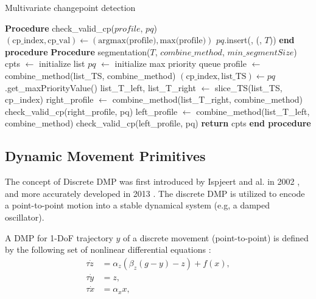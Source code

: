 \documentclass[conference]{IEEEtran}
\begin{document}
\begin{algorithm}
 \caption{Multivariate changepoint detection}
\begin{algorithmic}[1]
    \STATE \textbf{Procedure} check\_valid\_cp($profile$, $pq$)
    \STATE $(\text{cp\_index}, \text{cp\_val}) \leftarrow (\text{argmax(profile)}, \text{max(profile)})$
        \STATE $pq$.insert(, (, $T$))
    \ENDIF
    \STATE \textbf{end procedure}
    \STATE
    \STATE \textbf{Procedure} segmentation($T$, $combine\_method$, $min\_segmentSize$)
    \STATE cpts $\leftarrow$ initialize list
    \STATE $pq$ $\leftarrow$ initialize max priority queue
    \STATE profile $\leftarrow$ combine\_method(list\_TS, combine\_method)
        \STATE $(\text{cp\_index}, \text{list\_TS}) \leftarrow pq$.get\_maxPriorityValue()
        \STATE list\_T\_left, list\_T\_right $\leftarrow$ slice\_TS(list\_TS, cp\_index)
            \STATE right\_profile $\leftarrow$ combine\_method(list\_T\_right, combine\_method)
            \STATE check\_valid\_cp(right\_profile, pq)
        \ENDIF
            \STATE left\_profile $\leftarrow$ combine\_method(list\_T\_left, combine\_method)
            \STATE check\_valid\_cp(left\_profile, pq)
        \ENDIF
        \STATE
    \ENDWHILE
    \STATE \textbf{return} cpts
    \STATE \textbf{end procedure}
\end{algorithmic}
 \label{alg:CPD}
\end{algorithm}


\subsection{Dynamic Movement Primitives}

The concept of Discrete DMP was first introduced by Ispjeert and al. in 2002 \cite{ijspeert_movement_2002}, and more accurately developed in 2013 \cite{ijspeert_dynamical_2013}. The discrete DMP is utilized to encode a point-to-point motion into a stable dynamical system (e.g, a damped oscillator).

 A DMP for 1-DoF trajectory $y$ of a discrete movement (point-to-point) is defined by the following set of nonlinear differential equations \cite{ijspeert_movement_2002}:
\begin{align}
\tau \dot{z} &= \alpha_z \left(\beta_z(g - y) - z\right) + f(x),  \\
\tau \dot{y} &= z, \\
\tau \dot{x} &= \alpha_x x, 
\end{align}
\end{document}
